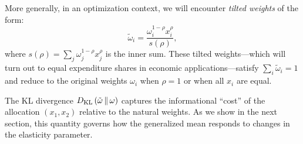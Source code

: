 More generally, in an optimization context, we will encounter \emph{tilted weights} of the form:
\begin{equation}
\label{eq:tilted-weights-preview}
\tilde{\omega}_i = \frac{\omega_i^{1-\rho} x_i^\rho}{s(\rho)},
\end{equation}
where $s(\rho) = \sum_j \omega_j^{1-\rho} x_j^\rho$ is the inner sum. These tilted weights---which will turn out to equal expenditure shares in economic applications---satisfy $\sum_i \tilde{\omega}_i = 1$ and reduce to the original weights $\omega_i$ when $\rho = 1$ or when all $x_i$ are equal.

The KL divergence $D_{\mathrm{KL}}\left(\tilde{\omega} \,\|\, \omega\right)$ captures the informational ``cost'' of the allocation $(x_1, x_2)$ relative to the natural weights. As we show in the next section, this quantity governs how the generalized mean responds to changes in the elasticity parameter.


